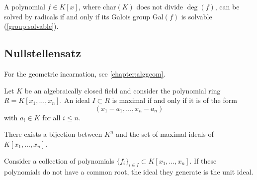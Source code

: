     \begin{theorem}[Galois]
        A polynomial $f\in K[x]$, where $\mathrm{char}(K)$ does not divide $\deg(f)$, can be solved by radicals if and only if its Galois group $\mathrm{Gal}(f)$ is solvable (\cref{group:solvable}).
    \end{theorem}


\subsection{Nullstellensatz}

    For the geometric incarnation, see \cref{chapter:alggeom}.

    \begin{theorem}
        Let $K$ be an algebraically closed field and consider the polynomial ring $R=K[x_1,\ldots,x_n]$. An ideal $I\subset R$ is maximal if and only if it is of the form \[(x_1-a_1,\ldots,x_n-a_n)\] with $a_i\in K$ for all $i\leq n$.
    \end{theorem}
    \begin{result}
        There exists a bijection between $K^n$ and the set of maximal ideals of $K[x_1,\ldots,x_n]$.
    \end{result}
    \begin{result}
        Consider a collection of polynomials $\{f_i\}_{i\in I}\subset K[x_1,\ldots,x_n]$. If these polynomials do not have a common root, the ideal they generate is the unit ideal.
    \end{result}

